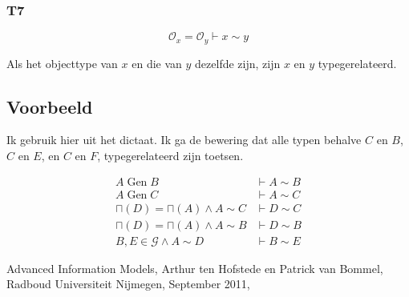 \documentclass{article}
\begin{document}
\subsubsection{T7}
\[
  \mathcal{O}_x = \mathcal{O}_y \vdash x \sim y
\]

Als het objecttype van $x$ en die van $y$ dezelfde zijn, zijn $x$ en $y$ 
typegerelateerd.

\subsection{Voorbeeld}

Ik gebruik hier \cite[figuur 2.26]{dictaat} uit het dictaat. Ik ga de bewering 
dat alle typen behalve $C$ en $B$, $C$ en $E$, en $C$ en $F$, typegerelateerd
zijn toetsen.

\begin{align}
  A \operatorname{Gen} B               & \vdash A \sim B \\
  A \operatorname{Gen} C                & \vdash A \sim C \\
  \sqcap(D) = \sqcap(A) \wedge A \sim C & \vdash D \sim C \\
  \sqcap(D) = \sqcap(A) \wedge A \sim B & \vdash D \sim B \\
  B, E \in \mathcal{G} \wedge A \sim D  & \vdash B \sim E 
\end{align}


\begin{thebibliography}{9}
    Advanced Information Models, 
    Arthur ten Hofstede en Patrick van Bommel,
    Radboud Universiteit Nijmegen,
    September 2011,
\end{thebibliography}
\end{document}
